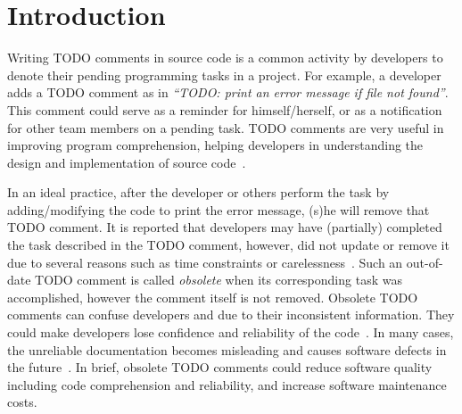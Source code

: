 \section{Introduction}
\label{intro:sec}

Writing TODO comments in source code is a common activity by
developers to denote their pending programming tasks in a project. For
example, a developer adds a TODO comment as in {\em ``TODO: print an
  error message if file not found''}. This comment could serve as a
reminder for himself/herself, or as a notification for other team members
on a pending task. TODO comments are very useful in improving
program comprehension, helping developers in understanding the design
and implementation of source code~\cite{souza-sigdoc05,ying-msr05}.

In an ideal practice, after the developer or others perform the task
by adding/modifying the code to print the error message, (s)he will
remove that TODO comment.  It is reported that developers may have
(partially) completed the task described in the TODO comment, however,
did not update or remove it due to several reasons such as time
constraints or
carelessness~\cite{tdcleaner-fse21,wen-icpc19,icomment-sosp07}. Such
an out-of-date TODO comment is called {\em obsolete} when its
corresponding task was accomplished, however the comment itself is not
removed. Obsolete TODO comments can confuse developers and due to
their inconsistent information. They could make developers lose
confidence and reliability of the
code~\cite{tdcleaner-fse21,icomment-sosp07}. In many cases, the
unreliable documentation becomes misleading and causes software
defects in the future~\cite{icomment-sosp07,lintan-icse11}. In brief,
obsolete TODO comments could reduce software quality including code
comprehension and reliability, and increase software maintenance
costs.

